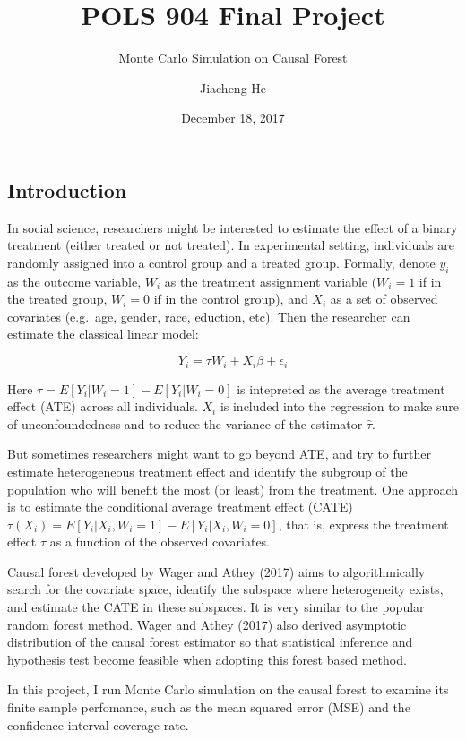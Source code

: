 \documentclass[]{article}
\title{POLS 904 Final Project}
\subtitle{Monte Carlo Simulation on Causal Forest}
\author{Jiacheng He}
\date{December 18, 2017}
\begin{document}
\maketitle

\subsection{Introduction}\label{introduction}

In social science, researchers might be interested to estimate the
effect of a binary treatment (either treated or not treated). In
experimental setting, individuals are randomly assigned into a control
group and a treated group. Formally, denote \(y_{i}\) as the outcome
variable, \(W_{i}\) as the treatment assignment variable (\(W_{i}=1\) if
in the treated group, \(W_{i}=0\) if in the control group), and
\(X_{i}\) as a set of observed covariates (e.g.~age, gender, race,
eduction, etc). Then the researcher can estimate the classical linear
model:

\begin{equation}
Y_{i}=\tau W_{i}+X_{i}\beta+\epsilon_{i}
\end{equation}

Here \(\tau=E[Y_{i} | W_{i}=1] - E[Y_{i}|W_{i}=0]\) is intepreted as the
average treatment effect (ATE) across all individuals. \(X_{i}\) is
included into the regression to make sure of unconfoundedness and to
reduce the variance of the estimator \(\hat{\tau}\).

But sometimes researchers might want to go beyond ATE, and try to
further estimate heterogeneous treatment effect and identify the
subgroup of the population who will benefit the most (or least) from the
treatment. One approach is to estimate the conditional average treatment
effect (CATE)
\(\tau(X_{i})=E[Y_{i} | X_{i},W_{i}=1] - E[Y_{i}| X_{i},W_{i}=0]\), that
is, express the treatment effect \(\tau\) as a function of the observed
covariates.

Causal forest developed by Wager and Athey (2017) aims to
algorithmically search for the covariate space, identify the subspace
where heterogeneity exists, and estimate the CATE in these subspaces. It
is very similar to the popular random forest method. Wager and Athey
(2017) also derived asymptotic distribution of the causal forest
estimator so that statistical inference and hypothesis test become
feasible when adopting this forest based method.

In this project, I run Monte Carlo simulation on the causal forest to
examine its finite sample perfomance, such as the mean squared error
(MSE) and the confidence interval coverage rate.
\end{document}
